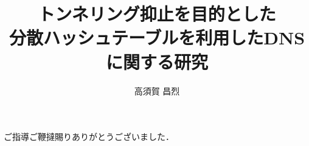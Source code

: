 \documentclass[12pt]{jarticle} %
\title{トンネリング抑止を目的とした\\分散ハッシュテーブルを利用したDNSに関する研究}
\author{高須賀 昌烈}
\begin{document}
\titlepage
\cmemberspage
\firstabstract
\secondabstract



\toc
\newpage
\listoffigures
\listoftables
\listofalgorithms



\newpage
{}











\newpage
\acknowledgements
ご指導ご鞭撻賜りありがとうございました．
\end{document}
